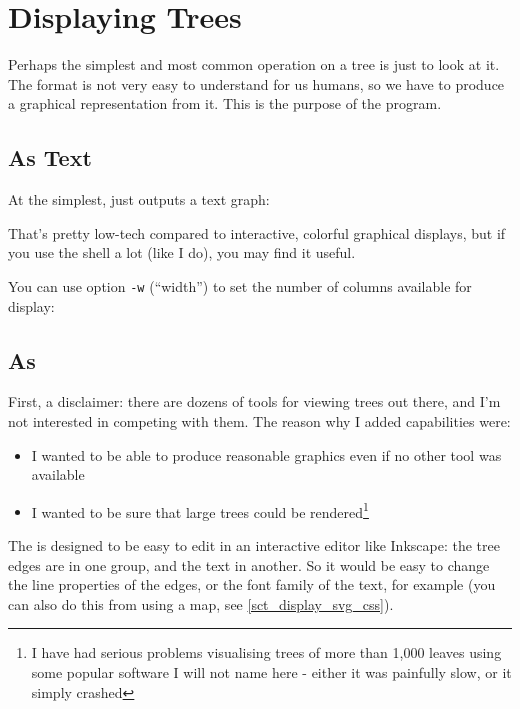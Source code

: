 
\section{Displaying Trees}
\label{sct_display}

Perhaps the simplest and most common operation on a \nw{} tree is just to look at it. The \nw{} format is not very easy to understand for us humans, so we have to produce a graphical representation from it. This is the purpose of the \display{} program. 

\subsection{As Text}
\label{sct_display_text}

At the simplest, \display{} just outputs a text graph:




That's pretty low-tech compared to interactive, colorful graphical displays, but if you use the shell a lot (like I do), you may find it useful.

You can use option \texttt{-w} (``width'') to set the number of columns available for display:




\subsection{As \svg}
\label{sct_display_svg}

First, a disclaimer: there are dozens of tools for viewing trees out there, and I'm not interested in competing with them. The reason why I added \svg{} capabilities were:
\begin{itemize}
 \item I wanted to be able to produce reasonable graphics even if no other tool was available
 \item I wanted to be sure that large trees could be rendered\footnote{I have had serious problems visualising trees of more than 1,000 leaves using some popular software I will not name here - either it was painfully slow, or it simply crashed} 
\end{itemize}
The \svg{} is designed to be easy to edit in an interactive editor like
Inkscape: the tree edges are in one group, and the text in another. So it would be easy to change the line properties of the edges, or the font family of the text, for example (you can also do this from \display{} using a \css{} map, see \ref{sct_display_svg_css}).


